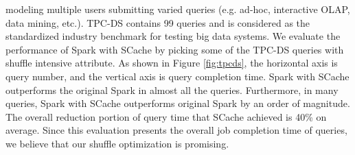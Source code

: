 modeling multiple users submitting varied queries (e.g. ad-hoc, interactive OLAP, data mining, etc.). TPC-DS contains 99 queries and is considered as the standardized industry benchmark for testing big data systems. We evaluate the performance of Spark with SCache by picking some of the TPC-DS queries with shuffle intensive attribute. 
As shown in Figure \ref{fig:tpcds}, the horizontal axis is query number, and the vertical axis is query completion time. Spark with SCache outperforms the original Spark in almost all the queries. Furthermore, in many queries, Spark with SCache outperforms original Spark by an order of magnitude. The overall reduction portion of query time that SCache achieved is 40\% on average. Since this evaluation presents the overall job completion time of queries, we believe that our shuffle optimization is promising.
